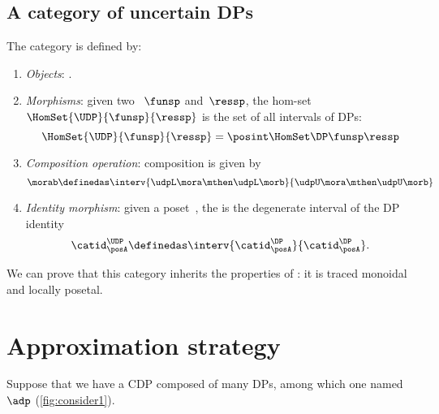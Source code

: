 \subsection{A category of uncertain DPs}

\begin{ctdefinition}
    \label{def:UDP}
    The category \UDP is defined by:
    \begin{enumerate}
        \item \emph{Objects}: .
        \item \emph{Morphisms}: given two ~$\funsp$ and~$\ressp$, the hom-set~$\HomSet{\UDP}{\funsp}{\ressp}$ is the set of all intervals of DPs:
              \begin{equation}
                  \HomSet{\UDP}{\funsp}{\ressp}=\posint \HomSet\DP\funsp\ressp
              \end{equation}
        \item \emph{Composition operation}: composition is given by
              \begin{equation}
                  \morab \definedas \interv{ \udpL\mora\mthen \udpL\morb}{\udpU\mora\mthen \udpU\morb}
              \end{equation}
        \item \emph{Identity morphism}: given a poset~\posA, the  is the degenerate interval of the DP identity
              \begin{equation}
                  \catid^{\UDP}_{\posA} \definedas \interv{\catid^{\DP}_\posA}{\catid^{\DP}_\posA}.
              \end{equation}
    \end{enumerate}
\end{ctdefinition}

We can prove that this category inherits the properties of \DP: it is traced monoidal and locally posetal.


\section{Approximation strategy}
\label{sec:Approximation-results}


Suppose that we have a CDP composed of many DPs, among which one named~$\adp$ (\cref{fig:consider1}).

